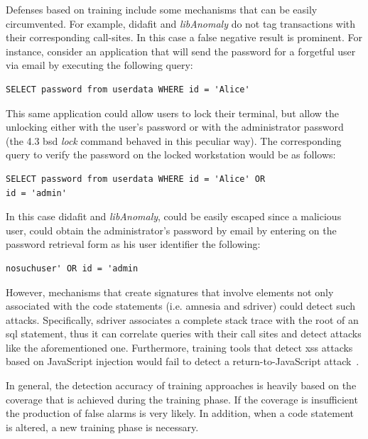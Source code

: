 \documentclass[conference]{IEEEtran}
\begin{document}
Defenses based on training include some mechanisms that can be easily
circumvented. For example, {\sc didafit} and {\it libAnomaly}
do not tag transactions with their corresponding call-sites.
In this case a false negative result
is prominent. For instance, consider an application that will send the
password for a forgetful user via email by executing the following
query:
\bgroup
\lstset{language=SQL}
\begin{small}
\begin{lstlisting}
SELECT password from userdata WHERE id = 'Alice'
\end{lstlisting}
\end{small}
\egroup
\noindent
This same application could allow users to lock their terminal,
but allow the unlocking either with the user's password or with
the administrator password (the 4.3 {\sc bsd} {\em lock} command
behaved in this peculiar way).
The corresponding query to verify the password on the locked
workstation would be as follows:
\bgroup
\lstset{language=SQL}
\begin{small}
\begin{lstlisting}
SELECT password from userdata WHERE id = 'Alice' OR
id = 'admin'
\end{lstlisting}
\end{small}
\egroup
\noindent
In this case {\sc didafit} and {\it libAnomaly}, could be easily escaped
since a malicious user, could obtain the administrator's password
by email by entering on the password retrieval form
as his user identifier the following:
\bgroup
\lstset{language=SQL}
\begin{small}
\begin{lstlisting}
nosuchuser' OR id = 'admin
\end{lstlisting}
\end{small}
\egroup
\noindent

However, mechanisms that create signatures that involve
elements not only associated with the code statements
(i.e. {\sc amnesia} and {\sc sd}river)
could detect such attacks. Specifically,
{\sc sd}river associates a complete stack trace with the
root of an {\sc sql} statement, thus it can correlate
queries with their call sites and detect attacks
like the aforementioned one.
Furthermore, training tools that detect
{\sc xss} attacks based on JavaScript injection
would fail to detect a return-to-JavaScript
attack~\cite{APKLM10}.

In general, the detection accuracy of training approaches is
heavily based on the coverage that is achieved during the
training phase. If the coverage is insufficient the
production of false alarms is very likely.
In addition, when a code statement is altered, a new
training phase is necessary.
\end{document}
